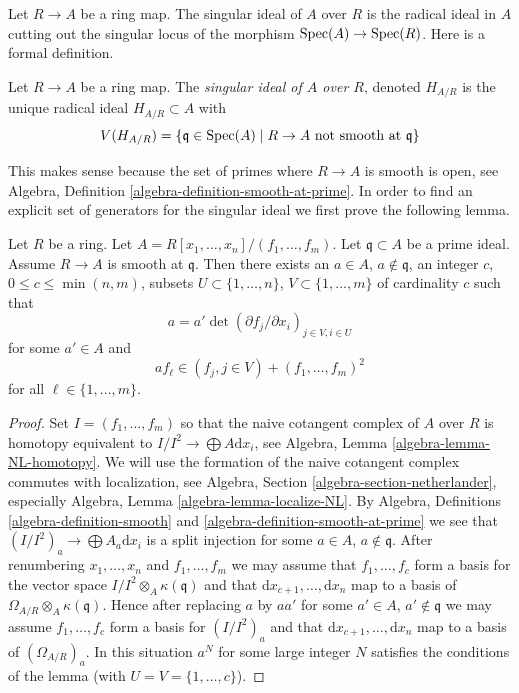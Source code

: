 \noindent
Let $R \to A$ be a ring map. The singular ideal of $A$ over $R$
is the radical ideal in $A$ cutting out the singular locus of the
morphism $\mathop{\mathrm{Spec}}(A) \to \mathop{\mathrm{Spec}}(R)$. Here is a formal definition.

\begin{definition}
\label{definition-singular-ideal}
Let $R \to A$ be a ring map. The {\it singular ideal of $A$ over $R$},
denoted $H_{A/R}$ is the unique radical ideal $H_{A/R} \subset A$ with
$$
V(H_{A/R}) = \{\mathfrak q \in \mathop{\mathrm{Spec}}(A) \mid R \to A
\text{ not smooth at }\mathfrak q\}
$$
\end{definition}

\noindent
This makes sense because the set of primes where $R \to A$ is smooth
is open, see
Algebra, Definition \ref{algebra-definition-smooth-at-prime}.
In order to find an explicit set
of generators for the singular ideal we first prove the following lemma.

\begin{lemma}
\label{lemma-find-strictly-standard}
Let $R$ be a ring. Let $A = R[x_1, \ldots, x_n]/(f_1, \ldots, f_m)$.
Let $\mathfrak q \subset A$ be a prime ideal. Assume $R \to A$ is smooth
at $\mathfrak q$. Then there exists an $a \in A$, $a \not \in \mathfrak q$,
an integer $c$, $0 \leq c \leq \min(n, m)$, subsets
$U \subset \{1, \ldots, n\}$, $V \subset \{1, \ldots, m\}$
of cardinality $c$ such that
$$
a = a' \det(\partial f_j/\partial x_i)_{j \in V, i \in U}
$$
for some $a' \in A$ and
$$
a f_\ell \in (f_j, j \in V) + (f_1, \ldots, f_m)^2
$$
for all $\ell \in \{1, \ldots, m\}$.
\end{lemma}

\begin{proof}
Set $I = (f_1, \ldots, f_m)$ so that the naive cotangent
complex of $A$ over $R$ is homotopy equivalent to
$I/I^2 \to \bigoplus A\text{d}x_i$, see
Algebra, Lemma \ref{algebra-lemma-NL-homotopy}.
We will use the formation of the naive cotangent complex commutes with
localization, see Algebra, Section \ref{algebra-section-netherlander},
especially Algebra, Lemma \ref{algebra-lemma-localize-NL}.
By Algebra, Definitions \ref{algebra-definition-smooth} and
\ref{algebra-definition-smooth-at-prime}
we see that $(I/I^2)_a \to \bigoplus A_a\text{d}x_i$
is a split injection for some $a \in A$, $a \not \in \mathfrak q$.
After renumbering $x_1, \ldots, x_n$ and $f_1, \ldots, f_m$ we may
assume that $f_1, \ldots, f_c$ form a basis for
the vector space $I/I^2 \otimes_A \kappa(\mathfrak q)$ and that
$\text{d}x_{c + 1}, \ldots, \text{d}x_n$ map to a basis of
$\Omega_{A/R} \otimes_A \kappa(\mathfrak q)$. Hence after replacing $a$
by $aa'$ for some $a' \in A$, $a' \not \in \mathfrak q$ we may assume
$f_1, \ldots, f_c$ form a basis for $(I/I^2)_a$ and that
$\text{d}x_{c + 1}, \ldots, \text{d}x_n$ map to a basis of
$(\Omega_{A/R})_a$. In this situation $a^N$ for some large integer
$N$ satisfies the conditions of the lemma (with $U = V = \{1, \ldots, c\}$).
\end{proof}

